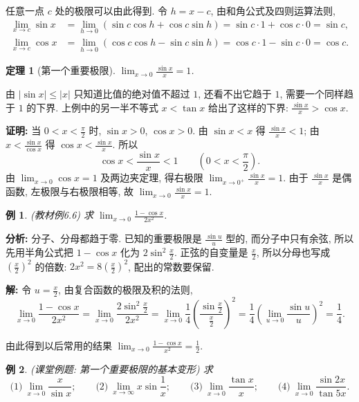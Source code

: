 \documentclass[UTF8,openany]{ctexbook}
\theoremstyle{chinesetextbook}
\newtheorem{example}{例}[section]
\newtheorem{theorem}{定理}[section]
\newenvironment{cnproof}{\par\indent\textbf{证明:} \ignorespaces}{\par}
\newenvironment{cnsolution}{\par\indent\textbf{解:} \ignorespaces}{\par}
\begin{document}
任意一点 $c$ 处的极限可以由此得到. 令 $h=x-c$, 由和角公式及四则运算法则,
\[
\begin{aligned}
\lim_{x\to c}\sin x&=\lim_{h\to0}(\sin c\cos h+\cos c\sin h)=\sin c\cdot1+\cos c\cdot0=\sin c,\\
\lim_{x\to c}\cos x&=\lim_{h\to0}(\cos c\cos h-\sin c\sin h)=\cos c\cdot1-\sin c\cdot0=\cos c.
\end{aligned}
\]
\begin{theorem}[第一个重要极限]
$\displaystyle\lim_{x\to0}\frac{\sin x}x=1$.
\end{theorem}
由 $|\sin x|\le|x|$ 只知道比值的绝对值不超过 $1$, 还看不出它趋于 $1$, 需要一个同样趋于 $1$ 的下界. 上例中的另一半不等式 $x<\tan x$ 给出了这样的下界: $\displaystyle\frac{\sin x}x>\cos x$.
\begin{cnproof}
当 $\displaystyle0<x<\frac\pi2$ 时, $\sin x>0$, $\cos x>0$. 由 $\sin x<x$ 得 $\displaystyle\frac{\sin x}x<1$; 由 $\displaystyle x<\frac{\sin x}{\cos x}$ 得 $\displaystyle\cos x<\frac{\sin x}x$. 所以
\[
\cos x<\frac{\sin x}x<1\qquad\left(0<x<\frac\pi2\right).
\]
由 $\displaystyle\lim_{x\to0}\cos x=1$ 及两边夹定理, 得右极限 $\displaystyle\lim_{x\to0^+}\frac{\sin x}x=1$. 由于 $\displaystyle\frac{\sin x}x$ 是偶函数, 左极限与右极限相等, 故 $\displaystyle\lim_{x\to0}\frac{\sin x}x=1$.
\end{cnproof}
\begin{example}\label{ex:6-6}
\textnormal{(教材例6.6)} 求 $\displaystyle\lim_{x\to0}\frac{1-\cos x}{2x^2}$.
\end{example}
\par\indent\textbf{分析:} 分子、分母都趋于零. 已知的重要极限是 $\displaystyle\frac{\sin u}u$ 型的, 而分子中只有余弦, 所以先用半角公式把 $1-\cos x$ 化为 $\displaystyle2\sin^2\frac x2$. 正弦的自变量是 $\displaystyle\frac x2$, 所以分母也写成 $\displaystyle\left(\frac x2\right)^2$ 的倍数: $\displaystyle2x^2=8\left(\frac x2\right)^2$, 配出的常数要保留.
\begin{cnsolution}
令 $\displaystyle u=\frac x2$, 由复合函数的极限及积的法则,
\[
\lim_{x\to0}\frac{1-\cos x}{2x^2}=\lim_{x\to0}\frac{2\sin^2\frac x2}{2x^2}=\lim_{x\to0}\frac14\left(\frac{\sin\frac x2}{\frac x2}\right)^2=\frac14\left(\lim_{u\to0}\frac{\sin u}u\right)^2=\frac14.
\]
\end{cnsolution}
由此得到以后常用的结果 $\displaystyle\lim_{x\to0}\frac{1-\cos x}{x^2}=\frac12$.
\begin{example}
\textnormal{(课堂例题: 第一个重要极限的基本变形)} 求
\[
\text{(1)}\ \lim_{x\to0}\frac x{\sin x};\qquad\text{(2)}\ \lim_{x\to\infty}x\sin\frac1x;\qquad\text{(3)}\ \lim_{x\to0}\frac{\tan x}x;\qquad\text{(4)}\ \lim_{x\to0}\frac{\sin2x}{\tan5x}.
\]
\end{example}
\end{document}
